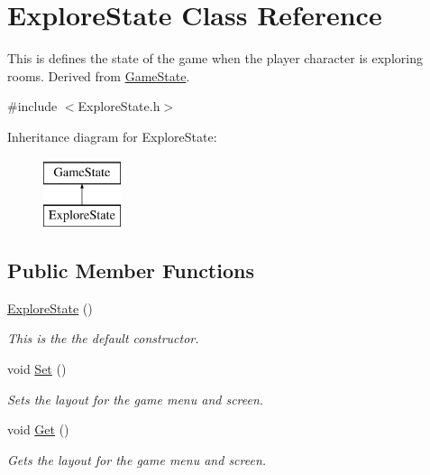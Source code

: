\hypertarget{classExploreState}{\section{Explore\-State Class Reference}
\label{classExploreState}
}


This is defines the state of the game when the player character is exploring rooms. Derived from \hyperlink{classGameState}{Game\-State}.  




{\ttfamily \#include $<$Explore\-State.\-h$>$}

Inheritance diagram for Explore\-State\-:\begin{figure}[H]
\begin{center}
\leavevmode
\includegraphics[height=2.000000cm]{classExploreState}
\end{center}
\end{figure}
\subsection*{Public Member Functions}
\begin{DoxyCompactItemize}
\item 
\hyperlink{classExploreState_ac10ad3cee219e8233a2c279392b70d52}{Explore\-State} ()
\begin{DoxyCompactList}\small\item\em This is the the default constructor. \end{DoxyCompactList}\item 
void \hyperlink{classExploreState_a8fb38f9fca513b87d914d077a0f2652b}{Set} ()
\begin{DoxyCompactList}\small\item\em Sets the layout for the game menu and screen. \end{DoxyCompactList}\item 
void \hyperlink{classExploreState_ace76d7a24bcb85f6f0a0fe0d0e763e21}{Get} ()
\begin{DoxyCompactList}\small\item\em Gets the layout for the game menu and screen. \end{DoxyCompactList}\end{DoxyCompactItemize}
